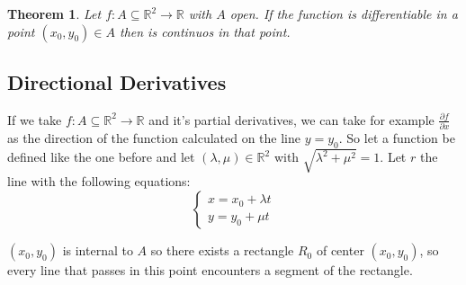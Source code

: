 \documentclass{article}
\newtheorem{theorem}{Theorem}
\begin{document}
    \begin{theorem} %
        Let $f : A \subseteq \mathbb{R}^2 \rightarrow \mathbb{R}$ with $A$ open. If the function is differentiable in a point $(x_0,y_0) \in A$ then is continuos in that point.
    \end{theorem}
    \subsection*{Directional Derivatives}
    If we take $f : A \subseteq \mathbb{R}^2 \rightarrow \mathbb{R}$ and it's partial derivatives, we can take for example $\frac{\partial f}{\partial x}$ as the direction of the function calculated on the line $y = y_0$.
    So let a function be defined like the one before and let $(\lambda, \mu) \in \mathbb{R}^2$ with $\sqrt{\lambda^2 + \mu^2} = 1$.
    Let $r$ the line with the following equations:
    \begin{equation*}
        \begin{cases}
            x = x_0 + \lambda t \\
            y = y_0 + \mu t
        \end{cases}
    \end{equation*}
    
    $(x_0, y_0)$ is internal to $A$ so there exists a rectangle $R_0$ of center $(x_0, y_0)$, so every line that passes in this point encounters a segment of the rectangle.
\end{document}
